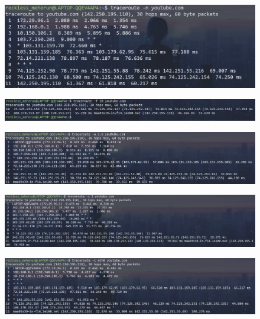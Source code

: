 \documentclass[11pt]{article}
\begin{document}
\begin{figure}[H]
\centering
\includegraphics[width=\textwidth]{res/traceroute 6.png}
\end{figure}
\begin{figure}[H]
\centering
\includegraphics[width=\textwidth]{res/traceroute 7.png}
\end{figure}
\begin{figure}[H]
\centering
\includegraphics[width=\textwidth]{res/traceroute 8.png}
\end{figure}
\begin{figure}[H]
\centering
\includegraphics[width=\textwidth]{res/traceroute 9.png}
\end{figure}
\begin{figure}[H]
\centering
\includegraphics[width=\textwidth]{res/traceroute 10.png}
\end{figure}
\end{document}
